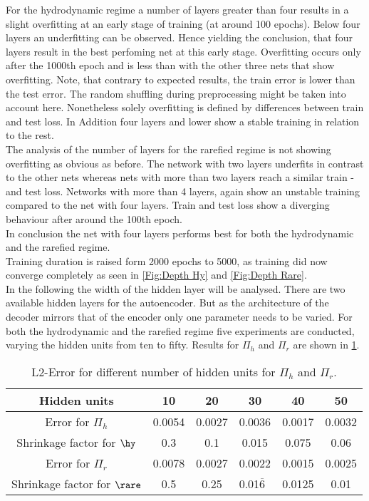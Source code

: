 For the hydrodynamic regime a number of layers greater than four results in a slight overfitting at an early stage of training (at around 100 epochs). Below four layers an underfitting can be observed. Hence yielding the conclusion, that four layers result in the best perfoming net at this early stage. Overfitting occurs only after the 1000th epoch and is less than with the other three nets that show overfitting. Note, that contrary to expected results, the train error is lower than the test error. The random shuffling during preprocessing might be taken into account here. Nonetheless solely overfitting is defined by differences between train and test loss. In Addition four layers and lower show a stable training in relation to the rest.\\
The analysis of the number of layers for the rarefied regime is not showing overfitting as obvious as before. The network with two layers underfits in contrast to the other nets whereas nets with more than two layers reach a similar train - and test loss. Networks with more than 4 layers, again show an unstable training compared to the net with four layers. Train and test loss show a diverging behaviour after around the 100th epoch.\\
In conclusion the net with four layers performs best for both the hydrodynamic and the rarefied regime.\\
Training duration is raised form 2000 epochs to 5000, as training did now converge completely as seen in \cref{Fig:Depth Hy} and \cref{Fig:Depth Rare}.\\
In the following the width of the hidden layer will be analysed. There are two available hidden layers for the autoencoder. But as the architecture of the decoder mirrors that of the encoder only one parameter needs to be varied. For both the hydrodynamic and the rarefied regime five experiments are conducted, varying the hidden units from ten to fifty. Results for \(\Pi_h\) and \(\Pi_r\) are shown in \cref{Tab:Hidden Units}.
\begin{table}[!htbp]\centering
	\begin{tabular}{ |c|c|c|c|c|c| }
		\hline
		Hidden units & 10 & 20 & 30  & 40 & 50 \\ [.5ex]
		\hline
		Error for \(\Pi_h\) & 0.0054 & 0.0027 & 0.0036 & 0.0017 & 0.0032\\ \hline
		Shrinkage factor for $\hy$ & 0.3 & 0.1 & 0.015 & 0.075 & 0.06\\ \hline
		Error for \(\Pi_r\)& 0.0078 & 0.0027 & 0.0022 & 0.0015 & 0.0025\\ \hline
		Shrinkage factor for $\rare$ & 0.5 & 0.25 & 0.01$\overline{6}$\ & 0.0125 & 0.01\\ \hline
	\end{tabular}
	\caption{L2-Error for different number of hidden units for \(\Pi_h\) and \(\Pi_r\).}
	\label{Tab:Hidden Units}
\end{table}

